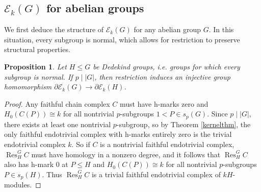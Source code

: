 \documentclass[10pt,letterpaper, boxed, cm]{amsart}
\newcommand{\Res}{\operatorname{Res}}
\newcommand{\calE}{\mathcal{E}}
\newtheorem{prop}[theorem]{Proposition}
\theoremstyle{remark}
\theoremstyle{definition}
\begin{document}
	\subsection{$\calE_k(G)$ for abelian groups}

	We first deduce the structure of $\calE_k(G)$ for any abelian group $G$. In this situation, every subgroup is normal, which allows for restriction to preserve structural properties.

	\begin{prop}\label{abelianfaithfulmorphism}
		Let $H \leq G$ be Dedekind groups, i.e. groups for which every subgroup is normal. If $p \mid |G|$, then restriction induces an injective group homomorphism $\partial\calE_k(G) \to \partial \calE_k(H)$.
	\end{prop}
	\begin{proof}
		Any faithful chain complex $C$ must have h-marks zero and $H_0(C(P)) \cong k$ for all nontrivial $p$-subgroups $1 < P \in s_p(G)$. Since $p \mid |G|$, there exists at least one nontrivial $p$-subgroup, so by Theorem \ref{kernelthm}, the only faithful endotrivial complex with h-marks entirely zero is the trivial endotrivial complex $k$. So if $C$ is a nontrivial faithful endotrivial complex, $\Res^G_H C$ must have homology in a nonzero degree, and it follows that $\Res^G_H C$ also has h-mark 0 at $P\leq H$ and $H_0(C(P)) \cong k$ for all nontrivial $p$-subgroups $P \in s_p(H)$. Thus $\Res^G_H C$ is a trivial faithful endotrivial complex of $kH$-modules.
	\end{proof}
\end{document}
